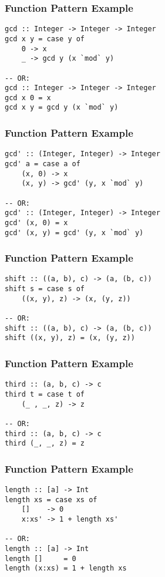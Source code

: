 \documentclass[dvipsnames]{beamer}
\theoremstyle{plain}
\begin{document}
\begin{frame}[fragile]
  \frametitle{Function Pattern Example}

  \begin{lstlisting}
gcd :: Integer -> Integer -> Integer
gcd x y = case y of
    0 -> x
    _ -> gcd y (x `mod` y)

-- OR:
gcd :: Integer -> Integer -> Integer
gcd x 0 = x
gcd x y = gcd y (x `mod` y)
  \end{lstlisting}
\end{frame}

\begin{frame}[fragile]
  \frametitle{Function Pattern Example}

  \begin{lstlisting}
gcd' :: (Integer, Integer) -> Integer
gcd' a = case a of
    (x, 0) -> x
    (x, y) -> gcd' (y, x `mod` y)

-- OR:
gcd' :: (Integer, Integer) -> Integer
gcd' (x, 0) = x
gcd' (x, y) = gcd' (y, x `mod` y)
  \end{lstlisting}
\end{frame}

\begin{frame}[fragile]
  \frametitle{Function Pattern Example}

  \begin{lstlisting}
shift :: ((a, b), c) -> (a, (b, c))
shift s = case s of
    ((x, y), z) -> (x, (y, z))

-- OR:
shift :: ((a, b), c) -> (a, (b, c))
shift ((x, y), z) = (x, (y, z))
  \end{lstlisting}
\end{frame}

\begin{frame}[fragile]
  \frametitle{Function Pattern Example}

  \begin{lstlisting}
third :: (a, b, c) -> c
third t = case t of
    (_ , _, z) -> z

-- OR:
third :: (a, b, c) -> c
third (_, _, z) = z
  \end{lstlisting}
\end{frame}

\begin{frame}[fragile]
  \frametitle{Function Pattern Example}

  \begin{lstlisting}[deletekeywords={length}]
length :: [a] -> Int
length xs = case xs of
    []    -> 0
    x:xs' -> 1 + length xs'

-- OR:
length :: [a] -> Int
length []     = 0
length (x:xs) = 1 + length xs
  \end{lstlisting}
\end{frame}
\end{document}
